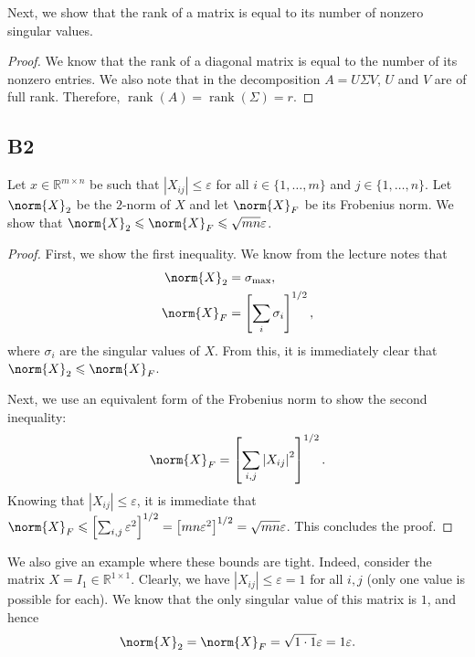 \documentclass[11pt]{article}
\newcommand{\abs}[1]{\left\lvert#1\right\lvert}
\DeclareMathOperator{\rank}{rank}
\newcommand{\real}{\mathbb{R}} %
\newcommand{\snorm}[1]{\norm{#1}_2} %
\newcommand{\fnorm}[1]{\norm{#1}_F} %
\begin{document}
Next, we show that the rank of a matrix is equal to its number of nonzero singular values.
\begin{proof}
	We know that the rank of a diagonal matrix is equal to the number of its nonzero entries.
	We also note that in the decomposition \(A = U \Sigma V\), \(U\) and \(V\) are of full rank.
	Therefore, \(\rank(A) = \rank(\Sigma) = r\).
\end{proof}

\subsection*{B2}
Let \(x \in \real^{m \times n}\) be such that \(\abs{X_{ij}} \leqslant \varepsilon\) for all \(i \in \{1, \dots, m\}\) and \(j \in \{1, \dots, n\}\).
Let \(\snorm{X}\) be the \(2\)-norm of \(X\) and let \(\fnorm{X}\) be its Frobenius norm.
We show that \(\snorm{X} \leqslant \fnorm{X} \leqslant \sqrt{mn} \varepsilon\).
\begin{proof}
	First, we show the first inequality.
	We know from the lecture notes that
	\begin{align*}
	\snorm{X} &= \sigma_{\textnormal{max}},\\
	\fnorm{X} &= \left[\sum_i \sigma_i\right]^{1/2},
	\end{align*}
	where \(\sigma_i\) are the singular values of \(X\).
	From this, it is immediately clear that \(\snorm{X} \leqslant \fnorm{X}\).
	
	Next, we use an equivalent form of the Frobenius norm to show the second inequality:
	\[
	\fnorm{X} = \left[\sum_{i, j} \abs{X_{ij}}^2 \right]^{1/2}.
	\]
	Knowing that \(\abs{X_{ij}} \leqslant \varepsilon\), it is immediate that \(\fnorm{X} \leqslant \left[\sum_{i, j} \varepsilon^2\right]^{1/2} = \left[mn \varepsilon^2\right]^{1/2} = \sqrt{mn} \varepsilon\).
	This concludes the proof.
\end{proof}

We also give an example where these bounds are tight.
Indeed, consider the matrix \(X = I_1 \in \real^{1 \times 1}\).
Clearly, we have \(\abs{X_{ij}} \leqslant \varepsilon = 1\) for all \(i, j\) (only one value is possible for each).
We know that the only singular value of this matrix is \(1\), and hence
\[
\snorm{X} = \fnorm{X} = \sqrt{1 \cdot 1} \varepsilon = 1 \varepsilon.
\]
\end{document}
